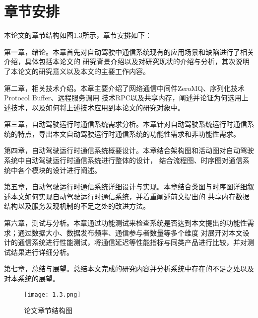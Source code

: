 \section{章节安排}
本论文的章节结构如图1.3所示，章节安排如下：

第一章，绪论。本章首先对自动驾驶中通信系统现有的应用场景和缺陷进行了相关介绍，具体包括本论文的
研究背景介绍以及对研究现状的介绍与分析，其次说明了本论文的研究意义以及本文的主要工作内容。

第二章，相关技术介绍。本章主要介绍了网络通信中间件ZeroMQ、序列化技术Protocol Buffer、远程服务调用
技术RPC以及共享内存，阐述并论证为何选用上述技术，以及如何将上述技术应用到本论文的研究对象中。

第三章，自动驾驶运行时通信系统需求分析。本章针对自动驾驶系统运行时通信系统的特点，导出本文自动驾驶运行时通信系统的功能性需求和非功能性需求。

第四章，自动驾驶运行时通信系统概要设计。本章结合架构图和活动图对自动驾驶系统中自动驾驶运行时通信系统进行整体的设计，
结合流程图、时序图对通信系统中各个模块的设计进行阐述。

第五章，自动驾驶运行时通信系统详细设计与实现。本章结合类图与时序图详细叙述本文如何实现自动驾驶运行时通信系统，并着重阐述前文提出的
共享内存数据结构以及服务发现机制的不足之处的改进方法。

第六章，测试与分析。本章通过功能测试来检查系统是否达到本文提出的功能性需求；通过数据大小、数据发布频率、通信参与者数量等多个维度
对展开对本文设计的通信系统进行性能测试，将通信延迟等性能指标与同类产品进行比较，并对测试结果进行详细分析。

第七章，总结与展望。总结本文完成的研究内容并分析系统中存在的不足之处以及对本系统的展望。

\begin{figure}[H]
  \centering
  \texttt{[image: 1.3.png]}
  \caption{论文章节结构图}
  \label{3}
\end{figure}







